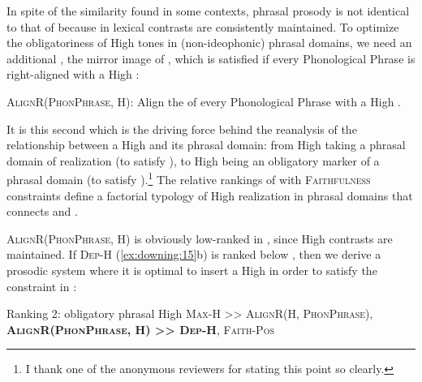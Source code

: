 \documentclass[output=paper
,newtxmath
,modfonts
,nonflat]{langsci/langscibook}
\begin{document}
In spite of the similarity found in some contexts,  phrasal prosody is not identical to that of  because in  lexical  contrasts are consistently maintained. To optimize the obligatoriness of High tones in  (non-ideophonic) phrasal domains, we need an additional , the mirror image of , which is satisfied if every Phonological Phrase is right-aligned with a High :

\begin{comment} 
\ea%
    \label{bkm:Ref336872332}
    \langinfo{lg}{fam}{src}\\
    \gll \\  
        \\
    \glt
    \z
\end{comment}

\ea\label{ex:downing:20}\textsc{AlignR(PhonPhrase, H}):
Align the  of every Phonological Phrase with a High .
\z

It is this second  which is the driving force behind the reanalysis of the relationship between a High  and its phrasal domain: from High  taking a phrasal domain of realization (to satisfy ), to High  being an obligatory marker of a phrasal domain (to satisfy ).\footnote{I thank one of the anonymous reviewers for stating this point so clearly.} The relative rankings of  with \textsc{Faithfulness} constraints define a factorial typology of High  realization in phrasal domains that connects  and .

\textsc{AlignR(PhonPhrase, H}) is obviously low-ranked in , since High  contrasts are maintained. If \textsc{Dep-H} (\ref{ex:downing:15}b) is ranked below , then we derive a prosodic system where it is optimal to insert a High  in order to satisfy the constraint in :
\begin{comment}
\ea%
    \label{bkm:Ref336872415}
    \langinfo{lg}{fam}{src}\\
    \gll \\  
        \\
    \glt
    \z
\end{comment}
\ea\label{ex:downing:21} Ranking 2: obligatory phrasal High 
\sn
\textsc{Max-H >> AlignR(H, PhonPhrase}), \textbf{\textsc{AlignR(PhonPhrase, H}}\textbf{) \textsc{>> Dep-H}}\textsc{, Faith-Pos}
\z
\end{document}
